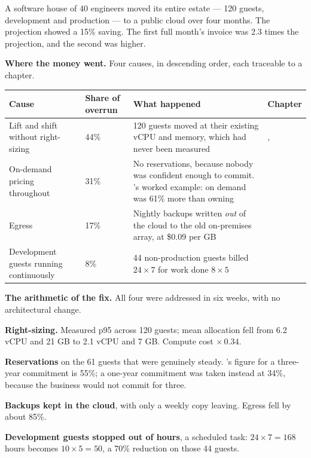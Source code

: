 \begin{conceptbox}
A software house of 40 engineers moved its entire estate --- 120 guests,
development and production --- to a public cloud over four months. The
projection showed a 15\% saving. The first full month's invoice was 2.3 times
the projection, and the second was higher.
\end{conceptbox}

\textbf{Where the money went.} Four causes, in descending order, each traceable
to a chapter.

\begin{longtable}{@{}L{3.7cm}L{2.2cm}L{4.3cm}L{4.5cm}@{}}
\toprule
{}
\textbf{Cause} & \textbf{Share of overrun} & \textbf{What happened} &
\textbf{Chapter} \\
\midrule
\endhead
Lift and shift without right-sizing & 44\% & 120 guests moved at their existing
vCPU and memory, which had never been measured & ,
 \\
On-demand pricing throughout & 31\% & No reservations, because nobody was
confident enough to commit. 's worked example: on demand was 61\%
more than owning &  \\
Egress & 17\% & Nightly backups written \emph{out} of the cloud to the old
on-premises array, at \$0.09 per GB &  \\
Development guests running continuously & 8\% & 44 non-production guests
billed $24 \times 7$ for work done $8 \times 5$ &  \\
\bottomrule
\end{longtable}

\textbf{The arithmetic of the fix.} All four were addressed in six weeks, with
no architectural change.

\begin{tight}
  \item \textbf{Right-sizing.} Measured p95 across 120 guests; mean allocation
        fell from 6.2 vCPU and 21 GB to 2.1 vCPU and 7 GB. Compute cost
        $\times\,0.34$.
  \item \textbf{Reservations} on the 61 guests that were genuinely steady.
        's figure for a three-year commitment is 55\%; a one-year
        commitment was taken instead at 34\%, because the business would not
        commit for three.
  \item \textbf{Backups kept in the cloud}, with only a weekly copy leaving.
        Egress fell by about 85\%.
  \item \textbf{Development guests stopped out of hours}, a scheduled task:
        $24 \times 7 = 168$ hours becomes $10 \times 5 = 50$, a 70\%
        reduction on those 44 guests.
\end{tight}

